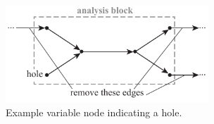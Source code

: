 \begin{description}
    \begin{figure}[htb!]
        \begin{center}
        \includegraphics[width=3in]{images/analysis_block_hole}
        \end{center}
        \vspace{-20pt}
    \caption{Example variable node indicating a hole.}
    \label{f:hole}
    \end{figure}


\end{description}
